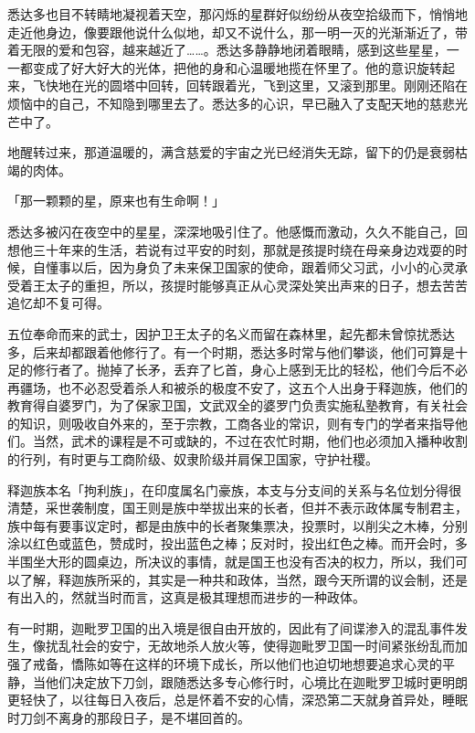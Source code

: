 \documentclass[12pt,twoside,openany]{book}
\begin{document}
悉达多也目不转睛地凝视着天空，那闪烁的星群好似纷纷从夜空拾级而下，悄悄地走近他身边，像要跟他说什么似地，却又不说什么，那一明一灭的光渐渐近了，带着无限的爱和包容，越来越近了……。悉达多静静地闭着眼睛，感到这些星星，一一都变成了好大好大的光体，把他的身和心温暖地揽在怀里了。他的意识旋转起来，飞快地在光的圆塔中回转，回转跟着光，飞到这里，又滚到那里。刚刚还陷在烦恼中的自己，不知隐到哪里去了。悉达多的心识，早已融入了支配天地的慈悲光芒中了。

地醒转过来，那道温暖的，满含慈爱的宇宙之光已经消失无踪，留下的仍是衰弱枯竭的肉体。

「那一颗颗的星，原来也有生命啊！」

悉达多被闪在夜空中的星星，深深地吸引住了。他感慨而激动，久久不能自己，回想他三十年来的生活，若说有过平安的时刻，那就是孩提时绕在母亲身边戏耍的时候，自懂事以后，因为身负了未来保卫国家的使命，跟着师父习武，小小的心灵承受着王太子的重担，所以，孩提时能够真正从心灵深处笑出声来的日子，想去苦苦追忆却不复可得。

五位奉命而来的武士，因护卫王太子的名义而留在森林里，起先都未曾惊扰悉达多，后来却都跟着他修行了。有一个时期，悉达多时常与他们攀谈，他们可算是十足的修行者了。抛掉了长矛，丢弃了匕首，身心上感到无比的轻松，他们今后不必再疆场，也不必忍受着杀人和被杀的极度不安了，这五个人出身于释迦族，他们的教育得自婆罗门，为了保家卫国，文武双全的婆罗门负责实施私塾教育，有关社会的知识，则吸收自外来的，至于宗教，工商各业的常识，则有专门的学者来指导他们。当然，武术的课程是不可或缺的，不过在农忙时期，他们也必须加入播种收割的行列，有时更与工商阶级、奴隶阶级并肩保卫国家，守护社稷。

释迦族本名「拘利族」，在印度属名门豪族，本支与分支间的关系与名位划分得很清楚，采世袭制度，国王则是族中举拔出来的长者，但并不表示政体属专制君主，族中每有要事议定时，都是由族中的长者聚集票决，投票时，以削尖之木棒，分别涂以红色或蓝色，赞成时，投出蓝色之棒；反对时，投出红色之棒。而开会时，多半围坐大形的圆桌边，所决议的事情，就是国王也没有否决的权力，所以，我们可以了解，释迦族所采的，其实是一种共和政体，当然，跟今天所谓的议会制，还是有出入的，然就当时而言，这真是极其理想而进步的一种政体。

有一时期，迦毗罗卫国的出入境是很自由开放的，因此有了间谍渗入的混乱事件发生，像扰乱社会的安宁，无故地杀人放火等，使得迦毗罗卫国一时间紧张纷乱而加强了戒备，憍陈如等在这样的环境下成长，所以他们也迫切地想要追求心灵的平静，当他们决定放下刀剑，跟随悉达多专心修行时，心境比在迦毗罗卫城时更明朗更轻快了，以往每日入夜后，总是怀着不安的心情，深恐第二天就身首异处，睡眠时刀剑不离身的那段日子，是不堪回首的。
\end{document}

